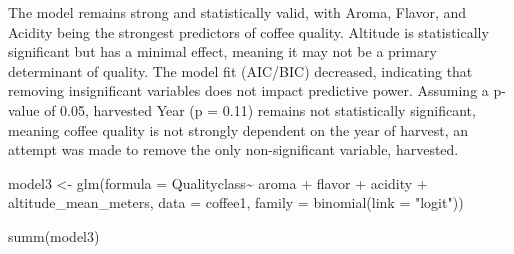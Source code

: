 \documentclass[
  letterpaper,
  DIV=11,
  numbers=noendperiod]{scrartcl}
\newenvironment{Shaded}{\begin{snugshade}}{\end{snugshade}}
\newcommand{\AttributeTok}[1]{\textcolor[rgb]{0.40,0.45,0.13}{#1}}
\newcommand{\FunctionTok}[1]{\textcolor[rgb]{0.28,0.35,0.67}{#1}}
\newcommand{\NormalTok}[1]{\textcolor[rgb]{0.00,0.23,0.31}{#1}}
\newcommand{\OtherTok}[1]{\textcolor[rgb]{0.00,0.23,0.31}{#1}}
\newcommand{\SpecialCharTok}[1]{\textcolor[rgb]{0.37,0.37,0.37}{#1}}
\newcommand{\StringTok}[1]{\textcolor[rgb]{0.13,0.47,0.30}{#1}}
\begin{document}
The model remains strong and statistically valid, with Aroma, Flavor,
and Acidity being the strongest predictors of coffee quality. Altitude
is statistically significant but has a minimal effect, meaning it may
not be a primary determinant of quality. The model fit (AIC/BIC)
decreased, indicating that removing insignificant variables does not
impact predictive power. Assuming a p-value of 0.05, harvested Year (p =
0.11) remains not statistically significant, meaning coffee quality is
not strongly dependent on the year of harvest, an attempt was made to
remove the only non-significant variable, harvested.

\begin{Shaded}
\begin{Highlighting}[]
\NormalTok{model3 }\OtherTok{\textless{}{-}} \FunctionTok{glm}\NormalTok{(}\AttributeTok{formula =}\NormalTok{ Qualityclass}\SpecialCharTok{\textasciitilde{}}\NormalTok{ aroma }\SpecialCharTok{+}\NormalTok{ flavor }\SpecialCharTok{+}\NormalTok{ acidity }\SpecialCharTok{+}
\NormalTok{               altitude\_mean\_meters,}
             \AttributeTok{data =}\NormalTok{ coffee1,}
             \AttributeTok{family =} \FunctionTok{binomial}\NormalTok{(}\AttributeTok{link =} \StringTok{"logit"}\NormalTok{))}

\FunctionTok{summ}\NormalTok{(model3)}
\end{Highlighting}
\end{Shaded}
\end{document}
